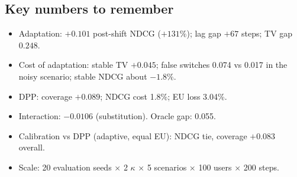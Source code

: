 \documentclass[11pt,a4paper]{article}
\begin{document}
\subsection*{Key numbers to remember}
\begin{itemize}
  \item Adaptation: $+0.101$ post-shift NDCG ($+131\%$); lag gap $+67$ steps; TV gap $0.248$.
  \item Cost of adaptation: stable TV $+0.045$; false switches 0.074 vs 0.017 in the noisy
        scenario; stable NDCG about $-1.8\%$.
  \item DPP: coverage $+0.089$; NDCG cost 1.8\%; EU loss 3.04\%.
  \item Interaction: $-0.0106$ (substitution). Oracle gap: 0.055.
  \item Calibration vs DPP (adaptive, equal EU): NDCG tie, coverage $+0.083$ overall.
  \item Scale: 20 evaluation seeds $\times$ 2 $\kappa$ $\times$ 5 scenarios $\times$ 100 users
        $\times$ 200 steps.
\end{itemize}



\end{document}
